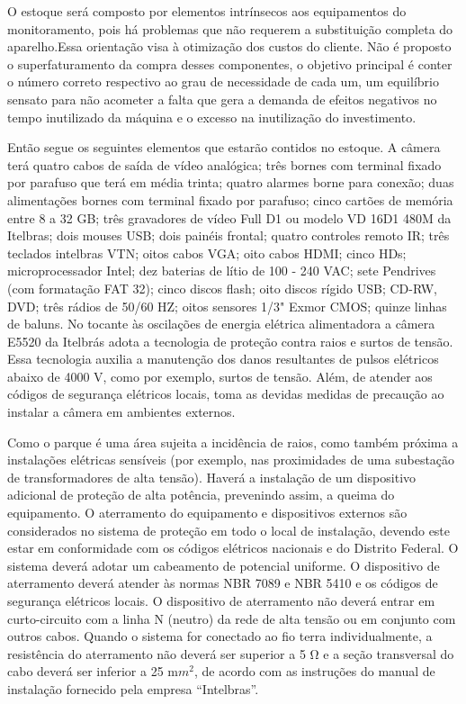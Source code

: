 	O estoque será composto por elementos intrínsecos aos equipamentos do monitoramento, pois há problemas que não requerem a substituição completa do aparelho.Essa orientação visa à otimização dos custos do cliente. Não é proposto o superfaturamento da compra desses componentes, o objetivo principal é conter o número correto respectivo ao grau de necessidade de cada um, um equilíbrio sensato para não acometer a falta que gera a demanda de efeitos negativos no tempo inutilizado da máquina e o excesso na inutilização do investimento.
	
	Então segue os seguintes elementos que estarão contidos no estoque. A câmera terá quatro cabos de saída de vídeo analógica; três bornes com terminal fixado por parafuso que terá em média trinta; quatro alarmes borne para conexão; duas alimentações bornes com terminal fixado por parafuso; cinco cartões de memória entre 8 a 32 GB; três gravadores de vídeo Full D1 ou modelo VD 16D1 480M da Itelbras; dois mouses USB; dois painéis frontal; quatro controles remoto IR; três teclados intelbras VTN; oitos cabos VGA; oito cabos HDMI; cinco HDs; microprocessador Intel; dez baterias de lítio de 100 - 240 VAC; sete Pendrives (com formatação FAT 32); cinco discos flash; oito discos rígido USB; CD-RW, DVD; três rádios de 50/60 HZ; oitos sensores 1/3" Exmor CMOS; quinze linhas de baluns. No tocante às oscilações de energia elétrica alimentadora a câmera E5520 da Itelbrás adota a tecnologia de proteção contra raios e surtos de tensão. Essa tecnologia auxilia a manutenção dos danos resultantes de pulsos elétricos abaixo de 4000 V, como por exemplo, surtos de tensão. Além, de atender aos códigos de segurança elétricos locais, toma as devidas medidas de precaução ao instalar a câmera em ambientes externos.
	
	Como o parque é uma área sujeita a incidência de raios, como também próxima a instalações elétricas sensíveis (por exemplo, nas proximidades de uma subestação de transformadores de alta tensão). Haverá a instalação de um dispositivo adicional de proteção de alta potência, prevenindo assim, a queima do equipamento. O aterramento do equipamento e dispositivos externos são considerados no sistema de proteção em todo o local de instalação, devendo este estar em conformidade com os códigos elétricos nacionais e do Distrito Federal. O sistema deverá adotar um cabeamento de potencial uniforme. O dispositivo de aterramento deverá atender às normas NBR 7089 e NBR 5410 e os códigos de segurança elétricos locais. O dispositivo de aterramento não deverá entrar em curto-circuito com a linha N (neutro) da rede de alta tensão ou em conjunto com outros cabos. Quando o sistema for conectado ao fio terra individualmente, a resistência do aterramento não deverá ser superior a 5 Ω e a seção transversal do cabo deverá ser inferior a 25 m$m^{2}$, de acordo com as instruções do manual de instalação fornecido pela empresa “Intelbras”.
	
